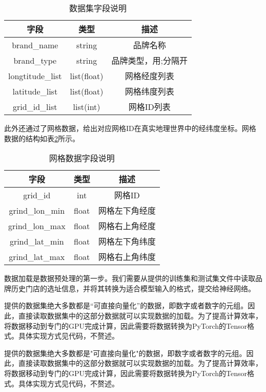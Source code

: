 \documentclass{article}
\begin{document}
\begin{table}[H]
\centering
\begin{tabular}{|c|c|c|}
\hline
\rowcolor[HTML]{D9EAD3}
\textbf{字段} & \textbf{类型} & \textbf{描述} \\ \hline
brand\_name & string & 品牌名称 \\ \hline
brand\_type & string & 品牌类型，用;分隔开 \\ \hline
longtitude\_list & list(float) & 网格经度列表 \\ \hline
latitude\_list & list(float) & 网格纬度列表 \\ \hline
grid\_id\_list & list(int) & 网格ID列表 \\ \hline
\end{tabular}
\caption{数据集字段说明}
\label{tab:dataset_fields}
\end{table}


此外还通过了网格数据，给出对应网格ID在真实地理世界中的经纬度坐标。网格数据的结构如表\ref{tab:grid_fields}所示。

\begin{table}[H]
\centering
\begin{tabular}{|c|c|c|}
\hline
\rowcolor[HTML]{D9EAD3}
\textbf{字段} & \textbf{类型} & \textbf{描述} \\ \hline
grid\_id & int & 网格ID \\ \hline
grind\_lon\_min & float & 网格左下角经度 \\ \hline
grind\_lon\_max & float & 网格右上角经度 \\ \hline
grind\_lat\_min & float & 网格左下角纬度 \\ \hline
grind\_lat\_max & float & 网格右上角纬度 \\ \hline
\end{tabular}
\caption{网格数据字段说明}
\label{tab:grid_fields}
\end{table}

数据加载是数据预处理的第一步。我们需要从提供的训练集和测试集文件中读取品牌历史门店的选址信息，并将其转换为适合模型输入的格式，提交给神经网络。

提供的数据集绝大多数都是“可直接向量化”的数据，即数字或者数字的元组。因此，直接读取数据集中的这部分数据就可以实现数据的加载。为了提高计算效率，将数据移动到专门的GPU完成计算，因此需要将数据转换为PyTorch的Tensor格式。具体实现方式见代码，不赘述。

提供的数据集绝大多数都是"可直接向量化"的数据，即数字或者数字的元组。因此，直接读取数据集中的这部分数据就可以实现数据的加载。为了提高计算效率，将数据移动到专门的GPU完成计算，因此需要将数据转换为PyTorch的Tensor格式。具体实现方式见代码，不赘述。
\end{document}
